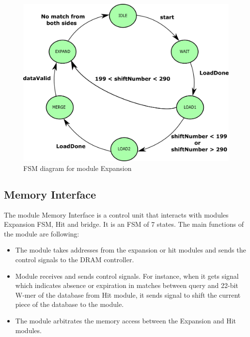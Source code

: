 \begin{figure}[t!]
\centering
\includegraphics[width=\columnwidth]{Figures/expandFSM.pdf}
\caption{FSM diagram for module Expansion} \label{fig:expandFSM}
\end{figure}
       
       
\subsection{Memory Interface}
The module Memory Interface is a control unit that interacts with modules Expansion FSM, Hit and bridge. 
It is an FSM of 7 states. The main functions of the module are following:
\begin{itemize}
\item The module takes addresses from the expansion or hit modules and sends the control signals to the DRAM controller.
\item Module receives and sends control signals. For instance, when it gets signal which indicates absence or expiration in matches between query and 22-bit W-mer of the database from Hit module, it sends signal to shift the current piece of the database to the module.
\item The module arbitrates the memory access between the Expansion and Hit modules. 
\end{itemize}



